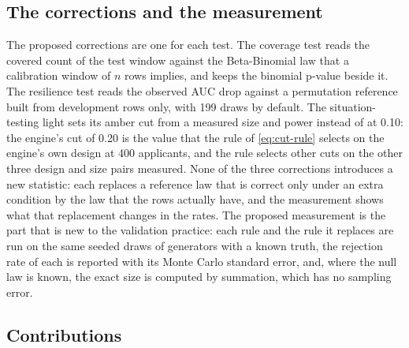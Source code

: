 \subsection*{The corrections and the measurement}

The proposed corrections are one for each test. The coverage test reads the covered count of the test window against the Beta-Binomial law that a calibration window of $n$ rows implies, and keeps the binomial p-value beside it. The resilience test reads the observed AUC drop against a permutation reference built from development rows only, with 199 draws by default. The situation-testing light sets its amber cut from a measured size and power instead of at 0.10: the engine's cut of 0.20 is the value that the rule of \cref{eq:cut-rule} selects on the engine's own design at 400 applicants, and the rule selects other cuts on the other three design and size pairs measured. None of the three corrections introduces a new statistic: each replaces a reference law that is correct only under an extra condition by the law that the rows actually have, and the measurement shows what that replacement changes in the rates. The proposed measurement is the part that is new to the validation practice: each rule and the rule it replaces are run on the same seeded draws of generators with a known truth, the rejection rate of each is reported with its Monte Carlo standard error, and, where the null law is known, the exact size is computed by summation, which has no sampling error.

\subsection*{Contributions}

